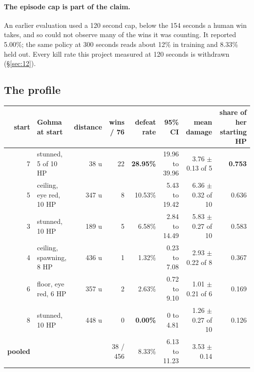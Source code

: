 \documentclass[11pt]{article}
\begin{document}
\paragraph{The episode cap is part of the claim.} An earlier evaluation used a 120 second cap, below the 154 seconds a human win takes, and so could not observe many of the wins it was counting. It reported 5.00\%; the same policy at 300 seconds reads about 12\% in training and 8.33\% held out. Every kill rate this project measured at 120 seconds is withdrawn (\S\ref{sec:12}).

\subsection{The profile}
\label{sec:5.1}

\begin{table}[!htbp]
  \centering
  \label{tab:theperstartprofileofthebestb}
\begin{center}\footnotesize
\begin{tabularx}{\linewidth}{@{}rXrrrrrr@{}}
\toprule
\textbf{start} & \textbf{Gohma at start} & \textbf{distance} & \textbf{wins / 76} & \textbf{defeat rate} & \textbf{95\% CI} & \textbf{mean damage} & \textbf{share of her starting HP} \\
\midrule
7 & stunned, 5 of 10 HP & 38 u & 22 & \textbf{28.95\%} & 19.96 to 39.96 & 3.76 $\pm$ 0.13 of 5 & \textbf{0.753} \\
5 & ceiling, eye red, 10 HP & 347 u & 8 & 10.53\% & 5.43 to 19.42 & 6.36 $\pm$ 0.32 of 10 & 0.636 \\
3 & stunned, 10 HP & 189 u & 5 & 6.58\% & 2.84 to 14.49 & 5.83 $\pm$ 0.27 of 10 & 0.583 \\
4 & ceiling, spawning, 8 HP & 436 u & 1 & 1.32\% & 0.23 to 7.08 & 2.93 $\pm$ 0.22 of 8 & 0.367 \\
6 & floor, eye red, 6 HP & 357 u & 2 & 2.63\% & 0.72 to 9.10 & 1.01 $\pm$ 0.21 of 6 & 0.169 \\
8 & stunned, 10 HP & 448 u & 0 & \textbf{0.00\%} & 0 to 4.81 & 1.26 $\pm$ 0.27 of 10 & 0.126 \\
\textbf{pooled} &  &  & 38 / 456 & 8.33\% & 6.13 to 11.23 & 3.53 $\pm$ 0.14 &  \\
\bottomrule
\end{tabularx}
\end{center}
\end{table}
\end{document}
